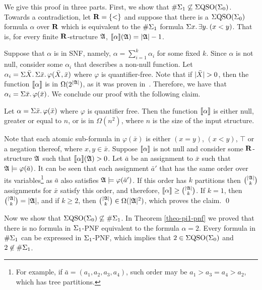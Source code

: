 
We give this proof in three parts.
First, we show that $\#\Sigma_{1} \not\subseteq \Sigma{\rm QSO}(\Sigma_{0})$. 
Towards a contradiction, let $\mathbf{R} = \{ < \}$ and suppose that there is a $\Sigma{\rm QSO}(\Sigma_{0})$ formula $\alpha$ over $\mathbf{R}$ which is equivalent to the $\#\Sigma_{1}$ formula $\Sigma{x}.\, \exists{y}.\: (x < y)$. 
That is, for every finite $\mathbf{R}$-structure $\mathfrak{A}$, ${\llbracket{}{\alpha}\rrbracket}(\mathfrak{A}) = \vert \mathfrak{A} \vert - 1$.

Suppose that $\alpha$ is in SNF, namely, $\alpha = \sum_{i = 1}^k \alpha_i$ for some fixed $k$. 
Since $\alpha$ is not null, consider some $\alpha_i$ that describes a non-null function. 
Let $\alpha_i = \Sigma{\bar{X}}.\,\Sigma{\bar{x}}.\,\varphi(\bar{X},\bar{x})$ where $\varphi$ is quantifier-free. 
Note that if $\vert \bar{X} \vert > 0$, then the function ${\llbracket{}{\alpha}\rrbracket}$ is in $\Omega(2^{\vert \mathfrak{A} \vert})$, as it was proven in~\cite{SalujaST95}. 
Therefore, we have that $\alpha_i = \Sigma{\bar{x}}.\,\varphi(\bar{x})$. 
We conclude our proof with the following claim.
\begin{clm}
	Let $\alpha = \Sigma{\bar{x}}.\,\varphi(\bar{x})$	where $\varphi$ is quantifier free. 
	Then the function ${\llbracket{}{\alpha}\rrbracket}$ is either null, greater or equal to $n$, or is in $\Omega(n^2)$, where $n$ is the size of the input structure.
\end{clm}
\proof
	Note that each atomic sub-formula in $\varphi(\bar{x})$ is either $(x = y)$, $(x < y)$, $\top$ or a negation thereof, where $x,y\in\bar{x}$. 
	Suppose ${\llbracket{}{\alpha}\rrbracket}$ is not null and consider some $\mathbf{R}$-structure $\mathfrak{A}$ such that ${\llbracket{}{\alpha}\rrbracket}(\mathfrak{A}) > 0$. 
	Let $\bar{a}$ be an assignment to $\bar{x}$ such that $\mathfrak{A}\models\varphi(\bar{a})$. 
	It can be seen that each assignment $\bar{a}'$ that has the same order over its variables\footnote{For example, if $\bar{a} = (a_1,a_2,a_3,a_4)$, such order may be $a_1 > a_3 = a_4 > a_2$, which has tree partitions.}	as $\bar{a}$ also satisfies $\mathfrak{A}\models\varphi(\bar{a}')$. 
	If this order has $k$ partitions then $\binom{\vert \mathfrak{A} \vert}{k}$ assignments for $\bar{x}$ satisfy this order, and therefore, ${\llbracket{}{\alpha}\rrbracket} \geq \binom{\vert \mathfrak{A} \vert}{k}$. 
	If $k = 1$, then $\binom{\vert \mathfrak{A} \vert}{k} = \vert \mathfrak{A} \vert$, and if $k \geq 2$, then $\binom{\vert \mathfrak{A} \vert}{k} \in \Omega(\vert \mathfrak{A} \vert^2)$, which proves the claim.
\qed

Now we show that $\Sigma{\rm QSO}(\Sigma_{0}) \not\subseteq \#\Sigma_{1}$. 
In Theorem \ref{theo-pi1-pnf} we proved that there is no formula in $\Sigma_{1}$-PNF equivalent to the formula $\alpha = 2$. 
Every formula in $\#\Sigma_{1}$ can be expressed in $\Sigma_{1}$-PNF, which implies that $2 \in \Sigma{\rm QSO}(\Sigma_{0})$ and $2 \not\in \#\Sigma_{1}$.

